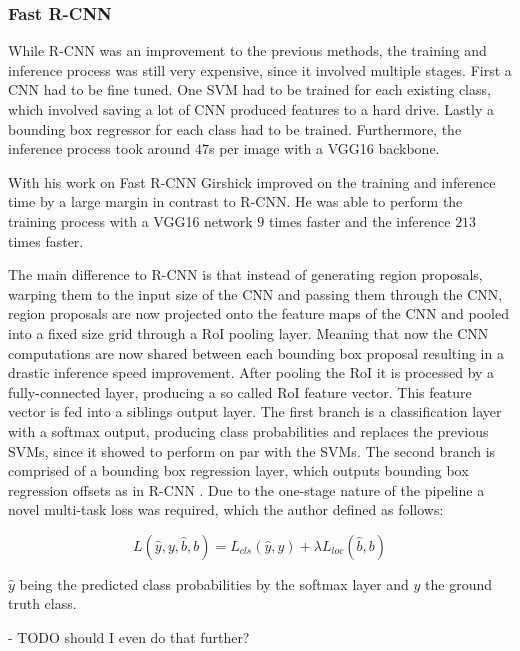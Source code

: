 \subsubsection{Fast R-CNN}
While \ac{R-CNN} was an improvement to the previous methods, the training and inference process was still very expensive, since it involved multiple stages.
First a \ac{CNN} had to be fine tuned. One \ac{SVM} had to be trained for each existing class, which involved saving a lot of \ac{CNN} produced features to a hard drive.
Lastly a bounding box regressor for each class had to be trained.
Furthermore, the inference process took around $47$s per image with a VGG16 \cite{vgg} backbone. \cite{fast_rcnn}

With his work on Fast R-CNN Girshick \cite{fast_rcnn} improved on the training and inference time by a large margin in contrast to \ac{R-CNN}.
He was able to perform the training process with a VGG16 network $9$ times faster and the inference $213$ times faster.

The main difference to \ac{R-CNN} is that instead of generating region proposals, warping them to the input size of the \ac{CNN} and passing them through the \ac{CNN}, region proposals are now projected onto the feature maps of the \ac{CNN} and pooled into a fixed size grid through a \ac{RoI} pooling layer.
Meaning that now the \ac{CNN} computations are now shared between each bounding box proposal resulting in a drastic inference speed improvement.
After pooling the \ac{RoI} it is processed by a fully-connected layer, producing a so called \ac{RoI} feature vector.
This feature vector is fed into a siblings output layer.
The first branch is a classification layer with a softmax output, producing class probabilities and replaces the previous \acp{SVM}, since it showed to perform on par with the \acp{SVM}.
The second branch is comprised of a bounding box regression layer, which outputs bounding box regression offsets as in \ac{R-CNN} \cite{rcnn}.
Due to the one-stage nature of the pipeline a novel multi-task loss was required,
which the author defined as follows:

\begin{equation}
    L(\hat{y}, y, \hat{b}, b) = L_{cls}(\hat{y}, y) + \lambda L_{loc}(\hat{b}, b)
\end{equation}

$\hat{y}$ being the predicted class probabilities by the softmax layer and $y$ the ground truth class.

- TODO should I even do that further?


